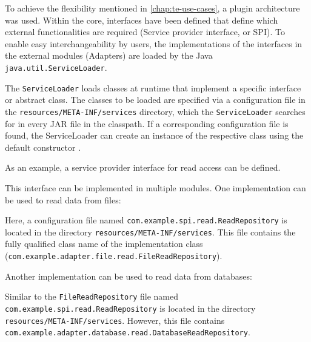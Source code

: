 To achieve the flexibility mentioned in \autoref{chap:te-use-cases}, a plugin architecture was used.
Within the core, interfaces have been defined that define which external functionalities are required (Service provider interface, or SPI).
To enable easy interchangeability by users, the implementations of the interfaces in the external modules (Adapters) are loaded by the Java \verb|java.util.ServiceLoader|.

The \verb|ServiceLoader| loads classes at runtime that implement a specific interface or abstract class.
The classes to be loaded are specified via a configuration file in the \verb|resources/META-INF/services| directory, which the \verb|ServiceLoader| searches for in every JAR file in the classpath.
If a corresponding configuration file is found, the ServiceLoader can create an instance of the respective class using the default constructor \cite{java-service-loader}.

As an example, a service provider interface for read access can be defined.



\noindent
This interface can be implemented in multiple modules.
One implementation can be used to read data from files:



\noindent
Here, a configuration file named \verb|com.example.spi.read.ReadRepository| is located in the directory \verb|resources/META-INF/services|.
This file contains the fully qualified class name of the implementation class \\(\verb|com.example.adapter.file.read.FileReadRepository|).

Another implementation can be used to read data from databases:



\noindent
Similar to the \verb|FileReadRepository| file named \\\verb|com.example.spi.read.ReadRepository| is located in the directory \\\verb|resources/META-INF/services|.
However, this file contains \\\verb|com.example.adapter.database.read.DatabaseReadRepository|.

